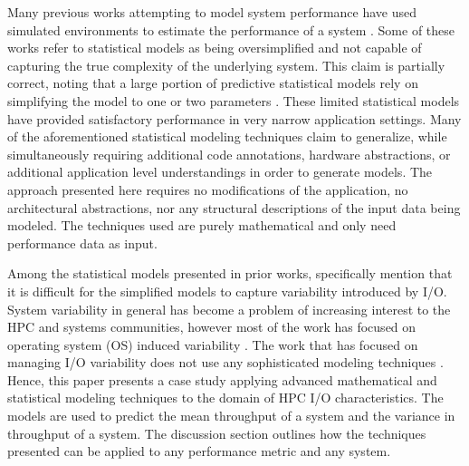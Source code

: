 \documentclass{scspaperproc}
\theoremstyle{scsthe}
\begin{document}
Many previous works attempting to model system performance have used
simulated environments to estimate the performance of a system
. Some
of these works refer to statistical models as being oversimplified and
not capable of capturing the true complexity of the underlying
system. This claim is partially correct, noting that a large portion
of predictive statistical models rely on simplifying the model to one
or two parameters
.
These limited statistical models have provided satisfactory
performance in very narrow application settings. Many of the
aforementioned statistical modeling techniques claim to generalize,
while simultaneously requiring additional code annotations, hardware
abstractions, or additional application level understandings in order
to generate models. The approach presented here requires no
modifications of the application, no architectural abstractions, nor
any structural descriptions of the input data being modeled. The
techniques used are purely mathematical and only need performance data
as input.

Among the statistical models presented in prior works,
 specifically mention that it is
difficult for the simplified models to capture variability introduced
by I/O. System variability in general has become a problem of
increasing interest to the HPC and systems communities, however most
of the work has focused on operating system (OS) induced variability
. The work that
has focused on managing I/O variability does not use any sophisticated
modeling techniques . Hence, this
paper presents a case study applying advanced mathematical and
statistical modeling techniques to the domain of HPC I/O
characteristics. The models are used to predict the mean throughput of
a system and the variance in throughput of a system. The discussion
section outlines how the techniques presented can be applied to any
performance metric and any system.


\end{document}
